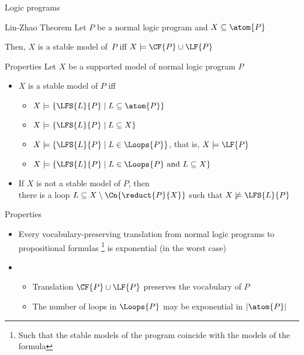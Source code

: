 \begin{frame}{Logic programs}
  \bigskip
  \begin{center}
    \begin{minipage}[t]{0.8\linewidth}
      \begin{block}{Lin-Zhao Theorem}
        Let $P$ be a normal logic program and $X\subseteq\atom{P}$
        \par\medskip
        Then, $X$ is a stable model of~$P$ iff $X\models\CF{P}\cup\LF{P}$
      \end{block}
    \end{minipage}
  \end{center}
\end{frame}
\begin{frame}{Properties}
  \bigskip
  Let $X$ be a supported model of normal logic program $P$
  \medskip
  \begin{itemize}
  \item<2-> $X$ is a stable model of $P$ iff
    \smallskip
    \begin{itemize}\normalsize
    \item $X\models\{  \LFS{L}{P} \mid L\subseteq\atom{P}  \}$
    \item $X\models\{  \LFS{L}{P} \mid L\subseteq X  \}$
    \item $X\models\{  \LFS{L}{P} \mid L\in\Loops{P}  \}$, that is, $X\models\LF{P}$
    \item $X\models\{  \LFS{L}{P} \mid L\in\Loops{P}\text{ and } L\subseteq X  \}$
    \end{itemize}
    \medskip
  \item<3-> If $X$ is not a stable model of $P$, then\\
    there is a loop $L \subseteq X \setminus \Cn{\reduct{P}{X}}$ such that $X \not\models \LFS{L}{P}$
  \end{itemize}
\end{frame}
\begin{frame}{Properties}
  \bigskip
  \begin{itemize}
  \item<1-> Every vocabulary-preserving translation from normal logic programs to
    propositional formulas%
    \footnote{Such that the stable models of the program coincide with the models of the formula}
    is exponential (in the worst case)
    \medskip
  \item<2-> \
    \begin{itemize}\normalsize
    \item Translation $\CF{P}\cup\LF{P}$ preserves the vocabulary of $P$
      \smallskip
    \item The number of loops in $\Loops{P}$ may be exponential in $|\atom{P}|$
    \end{itemize}
  \end{itemize}
\end{frame}
%

